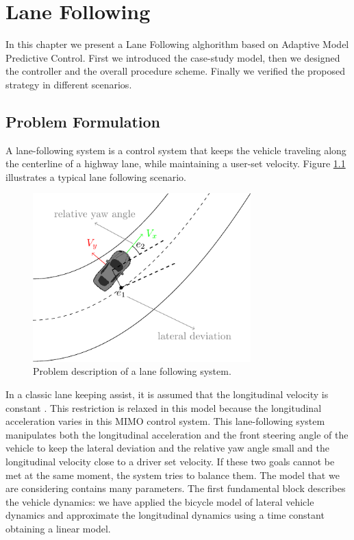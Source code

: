 \chapter{Lane Following}
In this chapter we present a Lane Following alghorithm based on Adaptive Model Predictive Control. First we introduced the case-study model, then we designed the controller and the overall procedure scheme. Finally we verified the proposed strategy in different scenarios.
\section{Problem Formulation}
A lane-following system is a control system that keeps the vehicle traveling along the centerline of a highway lane, while maintaining a user-set velocity. Figure \ref{fig:laneFollowing} illustrates a typical lane following scenario.
\begin{figure}[!h]
	\centering
	\includegraphics[width=0.75\textwidth]{../figure/laneFollowing/laneFollowing.pdf}
	\caption{Problem description of a lane following system.}
	\label{fig:laneFollowing}
\end{figure}

In a classic lane keeping assist, it is assumed that the longitudinal velocity is constant \cite{Adaptive_Mpc_Lane_keeping_borelli}. This restriction is relaxed in this model because the longitudinal acceleration varies in this MIMO control system. This lane-following system manipulates both the longitudinal acceleration and the front steering angle of the vehicle to keep the lateral deviation and the relative yaw angle small and the longitudinal velocity close to a driver set velocity. If these two goals cannot be met at the same moment, the system tries to balance them. The model that we are considering contains many parameters. The first fundamental block describes the vehicle dynamics: we have applied the bicycle model of lateral vehicle dynamics and approximate the longitudinal dynamics using a time constant obtaining  a linear model.

